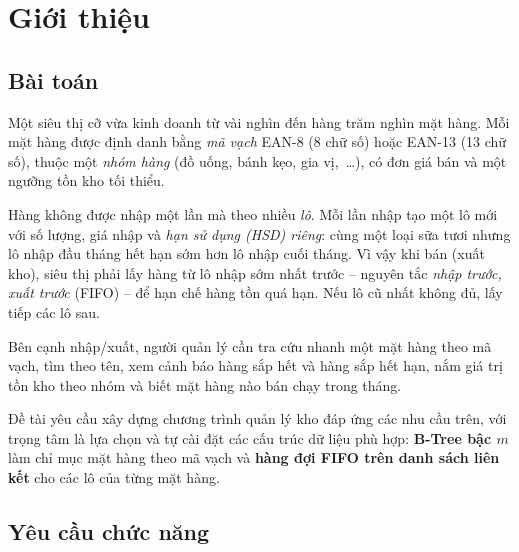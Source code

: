 \chapter{Giới thiệu}

\section{Bài toán}

Một siêu thị cỡ vừa kinh doanh từ vài nghìn đến hàng trăm nghìn mặt hàng. Mỗi mặt hàng được định danh
bằng \emph{mã vạch} EAN-8 (8 chữ số) hoặc EAN-13 (13 chữ số), thuộc một \emph{nhóm hàng}
(đồ uống, bánh kẹo, gia vị,~\ldots), có đơn giá bán và một ngưỡng tồn kho tối thiểu.

Hàng không được nhập một lần mà theo nhiều \emph{lô}. Mỗi lần nhập tạo một lô mới với số lượng, giá nhập
và \emph{hạn sử dụng (HSD) riêng}: cùng một loại sữa tươi nhưng lô nhập đầu tháng hết hạn sớm hơn lô nhập
cuối tháng. Vì vậy khi bán (xuất kho), siêu thị phải lấy hàng từ lô nhập sớm nhất trước --
nguyên tắc \emph{nhập trước, xuất trước} (FIFO) -- để hạn chế hàng tồn quá hạn. Nếu lô cũ nhất không đủ,
lấy tiếp các lô sau.

Bên cạnh nhập/xuất, người quản lý cần tra cứu nhanh một mặt hàng theo mã vạch, tìm theo tên, xem cảnh báo
hàng sắp hết và hàng sắp hết hạn, nắm giá trị tồn kho theo nhóm và biết mặt hàng nào bán chạy trong tháng.

Đề tài yêu cầu xây dựng chương trình quản lý kho đáp ứng các nhu cầu trên, với trọng tâm là lựa chọn và
tự cài đặt các cấu trúc dữ liệu phù hợp: \textbf{B-Tree bậc $m$} làm chỉ mục mặt hàng theo mã vạch và
\textbf{hàng đợi FIFO trên danh sách liên kết} cho các lô của từng mặt hàng.

\section{Yêu cầu chức năng}


